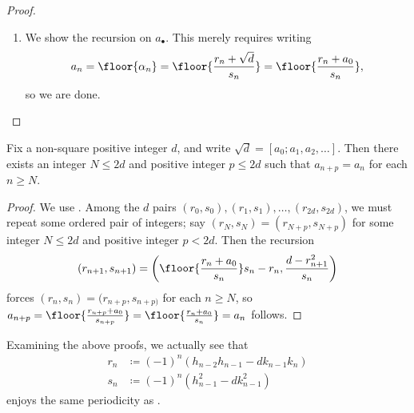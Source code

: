 \documentclass[../notes.tex]{subfiles}
\begin{document}
\begin{proof}
\begin{enumerate}
		Now, $\alpha_n=\frac{r_n+\sqrt d}{s_n}>1$ by the proof of , so adding and subtracting yields $\frac{2r_n}{s_n}>0$ and $\frac{2\sqrt d}{s_n}>1$, so $r_n>0$ and $s_n<2\sqrt d$ for $n>0$, thus completing the step.
		\item We show the recursion on $a_\bullet$. This merely requires writing
		\[a_n=\floor{\alpha_n}=\floor{\frac{r_n+\sqrt d}{s_n}}=\floor{\frac{r_n+a_0}{s_n}},\]
		so we are done.
		\qedhere
	\end{enumerate}
\end{proof}
\begin{corollary} \label{cor:cf-sqrt-d-periodic}
	Fix a non-square positive integer $d$, and write $\sqrt d=[a_0;a_1,a_2,\ldots]$. Then there exists an integer $N\le 2d$ and positive integer $p\le 2d$ such that $a_{n+p}=a_n$ for each $n\ge N$.
\end{corollary}
\begin{proof}
	We use . Among the $d$ pairs $(r_0,s_0),(r_1,s_1),\ldots,(r_{2d},s_{2d})$, we must repeat some ordered pair of integers; say $(r_N,s_N)=(r_{N+p},s_{N+p})$ for some integer $N\le2d$ and positive integer $p<2d$. Then the recursion
	\[(r_{n+1},s_{n+1})=\left(\floor{\frac{r_n+a_0}{s_n}}s_n-r_n,\frac{d-r_{n+1}^2}{s_n}\right)\]
	forces $(r_n,s_n)=(r_{n+p},s_{n+p)}$ for each $n\ge N$, so $a_{n+p}=\floor{\frac{r_{n+p}+a_0}{s_{n+p}}}=\floor{\frac{r_{n}+a_0}{s_{n}}}=a_n$ follows.
\end{proof}
\begin{remark} \label{rem:better-cf-sqrt-d-periodic}
	Examining the above proofs, we actually see that
	\begin{align*}
		r_n &\coloneqq (-1)^{n}(h_{n-2}h_{n-1}-dk_{n-1}k_n) \\
		s_n &\coloneqq (-1)^{n}\left(h_{n-1}^2-dk_{n-1}^2\right)
	\end{align*}
	enjoys the same periodicity as .
\end{remark}
\end{document}
